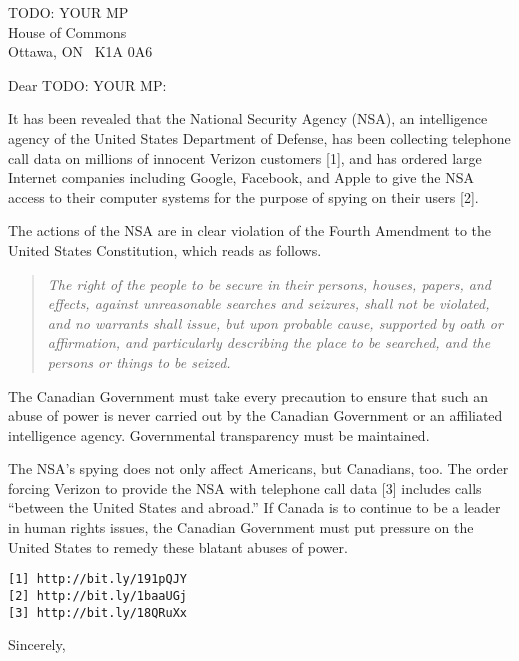 \documentclass{letter}
\begin{document}
\begin{letter}{TODO: YOUR MP \\ House of Commons\\ Ottawa, ON \ K1A 0A6}
\opening{Dear TODO: YOUR MP:}

It has been revealed that the National Security Agency (NSA), an intelligence
agency of the United States Department of Defense, has been collecting telephone
call data on millions of innocent Verizon customers [1], and has ordered large
Internet companies including Google, Facebook, and Apple to give the NSA access
to their computer systems for the purpose of spying on their users [2].

The actions of the NSA are in clear violation of the Fourth Amendment to the
United States Constitution, which reads as follows.

\begin{quote}
\emph{
The right of the people to be secure in their persons, houses, papers, and
effects, against unreasonable searches and seizures, shall not be violated, and
no warrants shall issue, but upon probable cause, supported by oath or
affirmation, and particularly describing the place to be searched, and the
persons or things to be seized. 
}
\end{quote}

The Canadian Government must take every precaution to ensure that such an abuse
of power is never carried out by the Canadian Government or an affiliated
intelligence agency. Governmental transparency must be maintained.

The NSA's spying does not only affect Americans, but Canadians, too. The order
forcing Verizon to provide the NSA with telephone call data [3] includes calls
``between the United States and abroad.'' If Canada is to continue to be
a leader in human rights issues, the Canadian Government must put pressure on
the United States to remedy these blatant abuses of power.

\begin{verbatim}
[1] http://bit.ly/191pQJY
[2] http://bit.ly/1baaUGj
[3] http://bit.ly/18QRuXx
\end{verbatim}

\closing{Sincerely,}
\end{letter}
\end{document}
